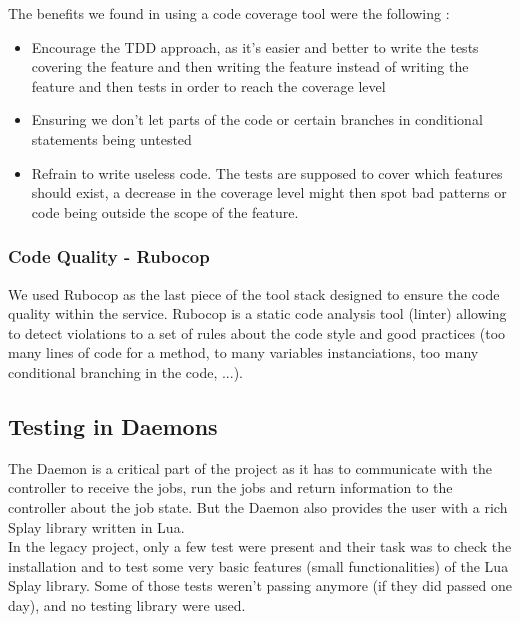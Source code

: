\documentclass{eplmastersthesis}
\begin{document}
          The benefits we found in using a code coverage tool were the
          following :

          \begin{itemize}
            \item Encourage the TDD approach, as it's easier and better to
            write the tests covering the feature and then writing the feature
            instead of writing the feature and then tests in order to reach
            the coverage level
            \item Ensuring we don't let parts of the code or certain branches
            in conditional statements being untested
            \item Refrain to write useless code. The tests are supposed to cover
            which features should exist, a decrease in the coverage level
            might then spot bad patterns or code being outside the scope
            of the feature.
          \end{itemize}

        \subsubsection{Code Quality - Rubocop}

          We used Rubocop as the last piece of the tool stack designed to ensure
          the code quality within the service. Rubocop is a static code analysis
          tool (linter) allowing to detect violations to a set of rules about
          the code style and good practices (too many lines of code for a method,
          to many variables instanciations, too many conditional branching
          in the code, ...).

      \subsection{Testing in Daemons}

        The Daemon is a critical part of the project as it has to communicate
        with the controller to receive the jobs, run the jobs and return
        information to the controller about the job state. But the Daemon also
        provides the user with a rich Splay library written in Lua.\\
        In the legacy project, only a few test were present and their
        task was to check the installation and to test some very basic features
        (small functionalities) of the Lua Splay library. Some of those tests
        weren't passing anymore (if they did passed one day), and no testing
        library were used.\\
\end{document}
